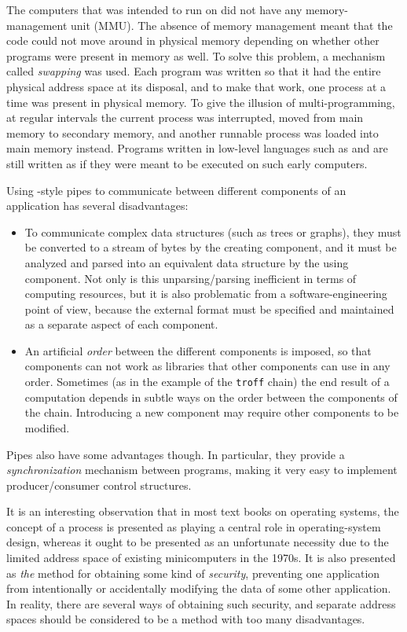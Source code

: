 The computers that \unix{} was intended to run on did not have any
memory-management unit (MMU).  The absence of memory management meant
that the code could not move around in physical memory depending on
whether other programs were present in memory as well.  To solve this
problem, a mechanism called \emph{swapping} was used.  Each program
was written so that it had the entire physical address space at its
disposal, and to make that work, one process at a time was present in
physical memory.  To give the illusion of multi-programming, at
regular intervals the current process was interrupted, moved from main
memory to secondary memory, and another runnable process was loaded
into main memory instead.  Programs written in low-level languages
such as \clanguage{} and \cplusplus{} are still written as if they
were meant to be executed on such early computers.

Using \unix{}-style pipes to communicate between different components of
an application has several disadvantages:

\begin{itemize}
\item To communicate complex data structures (such as trees or
graphs), they must be converted to a stream of bytes by the
creating component, and it must be analyzed and parsed into an
equivalent data structure by the using component.  Not only is
this unparsing/parsing inefficient in terms of computing
resources, but it is also problematic from a
software-engineering point of view, because the external format
must be specified and maintained as a separate aspect of each
component.
\item An artificial \emph{order} between the different components is
imposed, so that components can not work as libraries that other
components can use in any order.  Sometimes (as in the example
of the \texttt{troff} chain) the end result of a computation
depends in subtle ways on the order between the components of
the chain.  Introducing a new component may require other
components to be modified.  
\end{itemize}

Pipes also have some advantages though.  In particular, they provide a
\emph{synchronization} mechanism between programs, making it very easy
to implement producer/consumer control structures.

It is an interesting observation that in most text books on
operating systems, the concept of a process is presented as playing
a central role in operating-system design, whereas it ought to be
presented as an unfortunate necessity due to the limited address
space of existing minicomputers in the 1970s.  It is also presented
as \emph{the} method for obtaining some kind of \emph{security},
preventing one application from intentionally or accidentally
modifying the data of some other application.  In reality, there are
several ways of obtaining such security, and separate address spaces
should be considered to be a method with too many disadvantages. 

